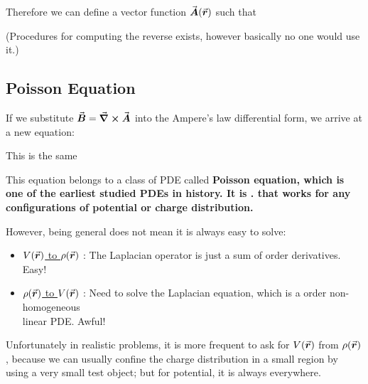 \documentclass[class=article, crop=false, 12pt]{standalone}
\begin{document}
Therefore we can define a vector function $\va*{A}(\va*{r})$ such that 

(Procedures for computing the reverse exists, however basically no one would use it.)

\subsection{Poisson Equation}

If we substitute $\va*{B} = \curl \va*{A}$ into the Ampere's law differential form,
we arrive at a new equation: 

This is the same 



This equation belongs to a class of PDE called \bf{Poisson equation}, 
which is one of the earliest studied PDEs in history.
It is .
that works for any configurations of potential or charge distribution.


However, being general does not mean it is always easy to solve: 
\begin{itemize}
    \item \ul{$V(\va*{r})$ to $\rho(\va*{r})$} : 
    The Laplacian operator is just a sum of  order derivatives. Easy!

    \item \ul{$\rho(\va*{r})$ to $V(\va*{r})$} : 
    Need to solve the Laplacian equation,
    which is a  order non-homogeneous
    \\  linear PDE. Awful!
\end{itemize} 

Unfortunately in realistic problems,
it is more frequent to ask for $V(\va*{r})$ from $\rho(\va*{r})$,
because we can usually confine the charge distribution in a small region by using a very small test object;
but for potential, it is always everywhere. 
\end{document}
